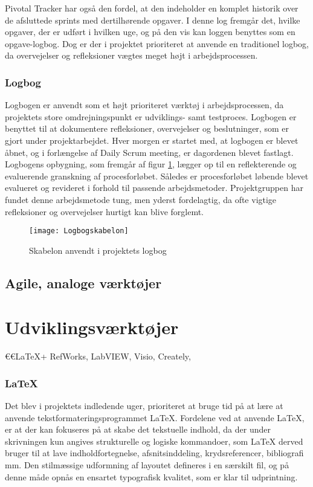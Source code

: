 	Pivotal Tracker har også den fordel, at den indeholder en komplet historik over de afsluttede sprints med dertilhørende opgaver. I denne log fremgår det, hvilke opgaver, der er udført i hvilken uge, og på den vis kan loggen benyttes som en opgave-logbog. Dog er der i projektet prioriteret at anvende en traditionel logbog, da overvejelser og refleksioner vægtes meget højt i arbejdsprocessen.	
	
	\subsubsection{Logbog}
	Logbogen er anvendt som et højt prioriteret værktøj i arbejdsprocessen, da projektets store omdrejningspunkt er udviklings- samt testproces. Logbogen er benyttet til at dokumentere refleksioner, overvejelser og beslutninger, som er gjort under projektarbejdet. Hver morgen er startet med, at logbogen er blevet åbnet, og i forlængelse af Daily Scrum meeting, er dagordenen blevet  fastlagt. Logbogens opbygning, som fremgår af figur \ref{fig:logbog}, lægger op til en reflekterende og evaluerende granskning af procesforløbet. Således er procesforløbet løbende blevet evalueret og revideret i forhold til passende arbejdsmetoder. Projektgruppen har fundet denne arbejdsmetode tung, men yderst fordelagtig, da ofte vigtige refleksioner og overvejelser hurtigt kan blive forglemt. 
	
	\begin{figure}[htb]
	\centering
	\texttt{[image: Logbogskabelon]}
	\caption{Skabelon anvendt i projektets logbog}
	\label{fig:logbog}	
	\end{figure}
	
	\subsection{Agile, analoge værktøjer}
	

\section{Udviklingsværktøjer}
	€€LaTeX+ RefWorks, LabVIEW, Visio, Creately, 

	\subsubsection{\LaTeX}
Det blev i projektets indledende uger, prioriteret at bruge tid på at lære at anvende tekstformateringsprogrammet \LaTeX. Fordelene ved at anvende LaTeX, er at der kan fokuseres på at skabe det tekstuelle indhold, da der under skrivningen kun angives strukturelle og logiske kommandoer, som LaTeX derved bruger til at lave indholdfortegnelse, afsnitsinddeling, krydsreferencer, bibliografi mm. Den stilmæssige udformning af layoutet defineres i en særskilt fil, og på denne måde opnås en ensartet typografisk kvalitet, som er klar til udprintning.   
